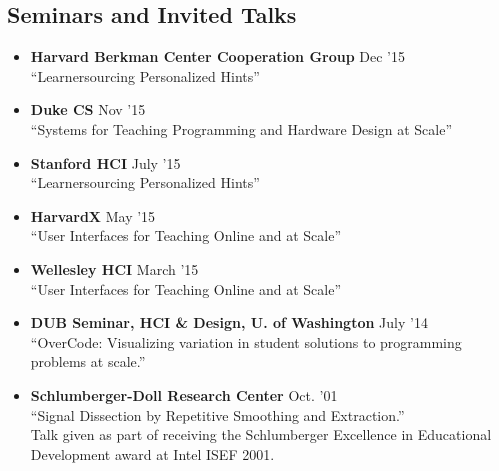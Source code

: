 \documentclass[margin]{res}
\begin{document}
\begin{resume}





\section{Seminars and Invited Talks}

\begin{itemize}[leftmargin=*] \itemsep -2pt
\item {\bf Harvard Berkman Center Cooperation Group} \hfill Dec '15 \\ ``Learnersourcing Personalized Hints''

\item {\bf Duke CS} \hfill Nov '15 \\ ``Systems for Teaching Programming and Hardware Design at Scale''

\item {\bf Stanford HCI} \hfill July '15 \\ ``Learnersourcing Personalized Hints''

\item {\bf HarvardX}  \hfill May '15 \\``User Interfaces for Teaching Online and at Scale''

\item {\bf Wellesley HCI}  \hfill March '15 \\``User Interfaces for Teaching Online and at Scale''


\item {\bf DUB Seminar, HCI \& Design, U. of Washington} \hfill July '14 \\``OverCode: Visualizing variation in student solutions to programming problems at scale.''

\item {\bf Schlumberger-Doll Research Center} \hfill Oct. '01 \\``Signal Dissection by Repetitive Smoothing and Extraction.'' \\
Talk given as part of receiving the Schlumberger Excellence in Educational Development award at Intel ISEF 2001.
\end{itemize}





\end{resume}
\end{document}
